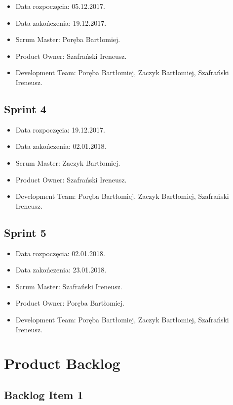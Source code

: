\documentclass[a4paper]{article}
\begin{document}
	\begin{itemize}
		\item Data rozpoczęcia: 05.12.2017.
		\item  Data zakończenia: 19.12.2017.
		\item Scrum Master: Poręba Bartłomiej.
		\item Product Owner: Szafrański Ireneusz.
		\item Development Team: Poręba Bartłomiej, Zaczyk Bartłomiej, Szafrański Ireneusz.
	\end{itemize}
	
	\subsection{Sprint 4}
	
	\begin{itemize}
		\item Data rozpoczęcia: 19.12.2017.
		\item  Data zakończenia: 02.01.2018.
		\item Scrum Master: Zaczyk Bartłomiej.
		\item Product Owner: Szafrański Ireneusz.
		\item Development Team: Poręba Bartłomiej, Zaczyk Bartłomiej, Szafrański Ireneusz.
	\end{itemize}
	
	\subsection{Sprint 5}
	
	\begin{itemize}
		\item Data rozpoczęcia: 02.01.2018.
		\item  Data zakończenia: 23.01.2018.
		\item Scrum Master: Szafrański Ireneusz.
		\item Product Owner: Poręba Bartłomiej.
		\item Development Team: Poręba Bartłomiej, Zaczyk Bartłomiej, Szafrański Ireneusz.
	\end{itemize}
	
	
	\section{Product Backlog}
	
	\subsection{Backlog Item 1}
\end{document}
